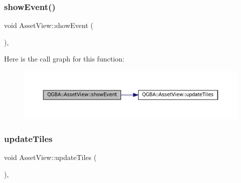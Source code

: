 \subsubsection{\texorpdfstring{show\+Event()}{showEvent()}}
{\footnotesize\ttfamily void Asset\+View\+::show\+Event (\begin{DoxyParamCaption}\item[{Q\+Show\+Event $\ast$}]{ }\end{DoxyParamCaption})\hspace{0.3cm}{\ttfamily [override]}, {\ttfamily [protected]}}

Here is the call graph for this function\+:
\nopagebreak
\begin{figure}[H]
\begin{center}
\leavevmode
\includegraphics[width=350pt]{class_q_g_b_a_1_1_asset_view_a56855e2ceca48f1940a5db614819d509_cgraph}
\end{center}
\end{figure}
\mbox{\label{class_q_g_b_a_1_1_asset_view_a193af696b5d01a5a382c0b9410d5b708}} 
\subsubsection{\texorpdfstring{update\+Tiles}{updateTiles}\hspace{0.1cm}{\footnotesize\ttfamily [1/2]}}
{\footnotesize\ttfamily void Asset\+View\+::update\+Tiles (\begin{DoxyParamCaption}{ }\end{DoxyParamCaption})\hspace{0.3cm}{\ttfamily [protected]}, {\ttfamily [slot]}}

